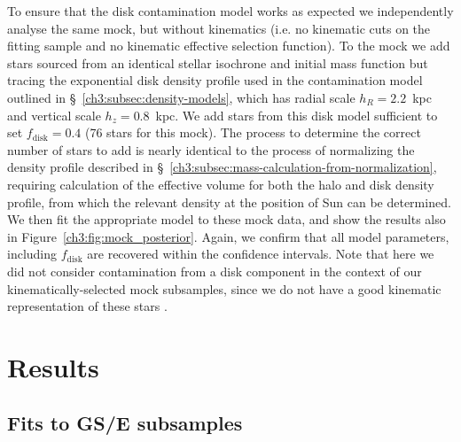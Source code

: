 To ensure that the disk contamination model works as expected we independently analyse the same mock, but without kinematics (i.e. no kinematic cuts on the fitting sample and no kinematic effective selection function). To the mock we add stars sourced from an identical stellar isochrone and initial mass function but tracing the exponential disk density profile used in the contamination model outlined in \S~\ref{ch3:subsec:density-models}, which has radial scale $h_{R} = 2.2$~kpc and vertical scale $h_{z} = 0.8$~kpc. We add stars from this disk model sufficient to set $f_\mathrm{disk}=0.4$ (76 stars for this mock). The process to determine the correct number of stars to add is nearly identical to the process of normalizing the density profile described in \S~\ref{ch3:subsec:mass-calculation-from-normalization}, requiring calculation of the effective volume for both the halo and disk density profile, from which the relevant density at the position of Sun can be determined. We then fit the appropriate model to these mock data, and show the results also in Figure~\ref{ch3:fig:mock_posterior}. Again, we confirm that all model parameters, including $f_\mathrm{disk}$ are recovered within the confidence intervals. Note that here we did not consider contamination from a disk component in the context of our kinematically-selected mock subsamples, since we do not have a good kinematic representation of these stars \parencite[see][ and discussion above]{lane22}.

\section{Results}
\label{ch3:sec:results}

\subsection{Fits to GS/E subsamples}
\label{ch3:subsec:fits-to-gse}



